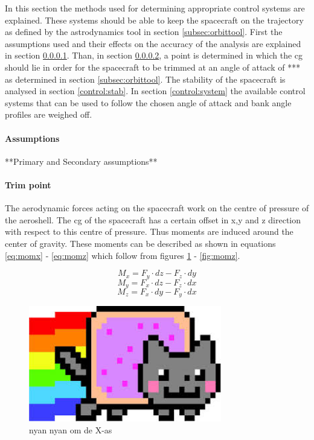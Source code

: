 In this section the methods used for determining appropriate control systems are explained. These systems should be able to keep the spacecraft on the trajectory as defined by the astrodynamics tool in section \ref{subsec:orbittool}. First the assumptions used and their effects on the accuracy of the analysis are explained in section \ref{control:assumptions}. Than, in section \ref{control:trim}, a point is determined in which the \gls{cg} should lie in order for the spacecraft to be trimmed at an angle of attack of *** as determined in section  \ref{subsec:orbittool}. The stability of the spacecraft is analysed in section \ref{control:stab}. In section \ref{control:system} the available control systems that can be used to follow the chosen angle of attack and bank angle profiles are weighed off.

\paragraph{Assumptions}
\label{control:assumptions}
**Primary and Secondary assumptions**

\paragraph{Trim point}
\label{control:trim}
The aerodynamic forces acting on the spacecraft work on the centre of pressure of the aeroshell. The \gls{cg} of the spacecraft has a certain offset in x,y and z direction with respect to this centre of pressure. Thus moments are induced around the center of gravity. These moments can be described as shown in equations \ref{eq:momx} - \ref{eq:momz} which follow from figures \ref{fig:momx} - \ref{fig:momz}.

\begin{equation}
\label{eq:momx}
M_x = F_y \cdot dz - F_z \cdot dy
\end{equation}
\begin{equation}
\label{eq:momy}
M_y = F_x \cdot dz - F_z \cdot dx
\end{equation}
\begin{equation}
\label{eq:momz}
M_z = F_x \cdot dy - F_y \cdot dx
\end{equation}

\begin{figure}[h]
	\centering
	\includegraphics[width=0.75\textwidth]{./Figure/Nyan}
	\caption{nyan nyan om de X-as}
	\label{fig:momx}
\end{figure}

